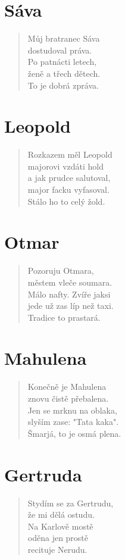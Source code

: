 \section*{Sáva}
\begin{verse}
Můj bratranec Sáva\\
dostudoval práva.\\
Po patnácti letech,\\
ženě a třech dětech.\\
To je dobrá zpráva.
\end{verse}

\section*{Leopold}
\begin{verse}
Rozkazem měl Leopold\\
majorovi vzdáti hold\\
a jak prudce salutoval,\\
major facku vyfasoval.\\
Stálo ho to celý žold.
\end{verse}

\section*{Otmar}
\begin{verse}
Pozoruju Otmara,\\
městem vleče soumara.\\
Málo nafty. Zvíře jaksi\\
jede už zas líp než taxi.\\
Tradice to prastará.
\end{verse}

\section*{Mahulena}
\begin{verse}
Konečně je Mahulena\\
znovu čistě přebalena.\\
Jen se mrknu na oblaka,\\
slyším zase: "Tata kaka".\\
Šmarjá, to je osmá plena.
\end{verse}

\section*{Gertruda}
\begin{verse}
Stydím se za Gertrudu,\\
že mi dělá ostudu.\\
Na Karlově mostě\\
oděna jen prostě\\
recituje Nerudu.
\end{verse}


